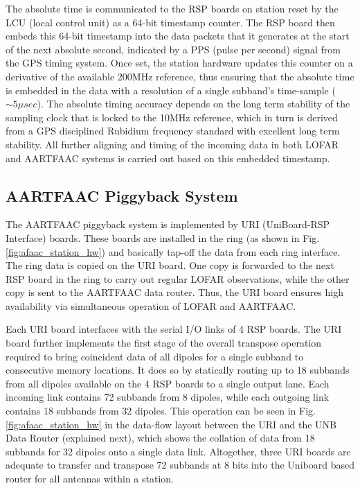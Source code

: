 \documentclass{ws-jai}
\begin{document}
The absolute time is communicated to the  RSP boards on station reset by the LCU
(local control  unit) as a 64-bit  timestamp counter. The RSP  board then embeds
this 64-bit timestamp  into the data packets  that it generates at  the start of
the next absolute second, indicated by a  PPS (pulse per second) signal from the
GPS timing  system.  Once set,  the station hardware  updates this counter  on a
derivative of  the available 200MHz  reference, thus ensuring that  the absolute
time  is  embedded  in  the  data  with a  resolution  of  a  single  subband's
time-sample ($\sim5\mu sec$).  The absolute  timing accuracy depends on the long
term stability  of the  sampling clock  that is locked  to the  10MHz reference,
which in turn is derived from a GPS disciplined Rubidium frequency standard with
excellent long term stability.  All further  aligning and timing of the incoming
data in both  LOFAR and AARTFAAC systems  is carried out based  on this embedded
timestamp.

\subsection {AARTFAAC Piggyback System}
The AARTFAAC  piggyback system  is implemented  by URI  (UniBoard-RSP Interface)
boards.   These   boards   are   installed    in   the   ring   (as   shown   in
Fig. \ref{fig:afaac_station_hw}) and  basically tap-off the data  from each ring
interface. The ring  data is copied on  the URI board. One copy  is forwarded to
the next RSP  board in the ring  to carry out regular  LOFAR observations, while
the other copy is sent to the  AARTFAAC data router. Thus, the URI board ensures
high availability via simultaneous operation of LOFAR and AARTFAAC.

Each URI board  interfaces with the serial  I/O links of 4 RSP  boards.  The URI
board  further implements  the first  stage of  the overall  transpose operation
required  to bring  coincident  data of  all  dipoles for  a  single subband  to
consecutive  memory locations.   It  does  so by  statically  routing  up to  18
subbands from all dipoles available on the 4 RSP boards to a single output lane.
Each incoming link contains 72 subbands from 8 dipoles, while each outgoing link
contains  18  subbands  from  32  dipoles.    This  operation  can  be  seen  in
Fig. \ref{fig:afaac_station_hw} in the data-flow  layout between the URI and the
UNB Data  Router (explained  next), which  shows the collation  of data  from 18
subbands for 32  dipoles onto a single data link.   Altogether, three URI boards
are adequate to  transfer and transpose 72 subbands at  8 bits into the Uniboard
based router for all antennas within a station.\\
\end{document}
